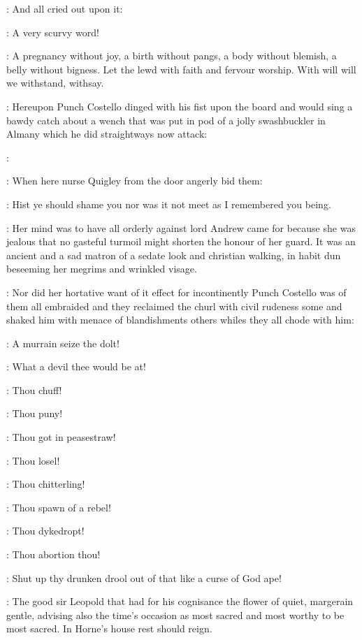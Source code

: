 :
And all cried out upon it:

\All:
A very scurvy word!

\stephen:
A pregnancy without joy,
a birth without pangs,
a body without blemish,
a belly without bigness.
Let the lewd with faith and fervour
worship.
With will will we withstand,
withsay.


:
Hereupon Punch Costello dinged with his fist upon the board and would
sing a bawdy catch  about a wench that was
put in pod of a jolly swashbuckler in Almany which he did straightways
now attack:

\punch:

:
When here nurse Quigley from the door angerly bid them:

\nursequigley:
Hist ye should shame you nor was it not meet as
I remembered you being.

:
Her mind was to have all orderly
against lord Andrew came for because she was jealous that no gasteful turmoil might
shorten the honour of her guard.
It was an ancient and a sad matron of a sedate look and christian walking,
in habit dun beseeming her megrims and wrinkled visage.

:
Nor did her hortative want of it effect for
incontinently Punch Costello was of them all embraided and they reclaimed
the churl with civil rudeness some and shaked him with menace of
blandishments others whiles they all chode with him:

\lynch:
A murrain seize the dolt!

\madden:
What a devil thee would be at!

\crotthers:
Thou chuff!

\dixon:
Thou puny!

\lenehan:
Thou got in peasestraw!

\lynch:
Thou losel!

\madden:
Thou chitterling!

\crotthers:
Thou spawn of a rebel!

\lenehan:
Thou dykedropt!

\dixon:
Thou abortion thou!

\stephen:
Shut up thy drunken drool out of that like a curse of God ape!

:
The good sir Leopold
that had for his cognisance
the flower of quiet,
margerain gentle,
advising also the time's occasion
as most sacred and most worthy to be most sacred.
In Horne's house rest
should reign.

